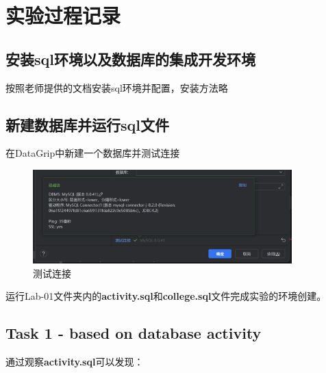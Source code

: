 \documentclass{article}
\begin{document}
    \section{实验过程记录}
    
    \subsection{安装sql环境以及数据库的集成开发环境}
    
    按照老师提供的文档安装sql环境并配置，安装方法略
    
    \subsection{新建数据库并运行sql文件}
    
    在DataGrip中新建一个数据库并测试连接
    
    \begin{figure}[H]
    	\centering
    	\includegraphics[width=10cm]{./images/1.测试连接.png}
    	\caption{测试连接}
    \end{figure}
    
    运行Lab-01文件夹内的\textbf{activity.sql}和\textbf{college.sql}文件完成实验的环境创建。
    
    \subsection{Task 1 - based on database activity}
    
    通过观察\textbf{activity.sql}可以发现：
    
\end{document}
